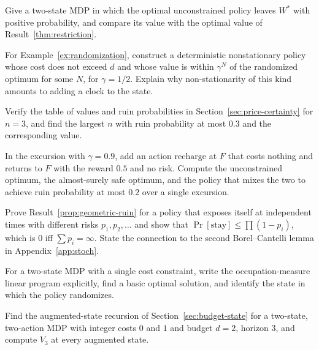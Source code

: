 \begin{exercise}
Give a two-state MDP in which the optimal unconstrained policy leaves $W^{*}$ with positive probability, and compare its value with the optimal value of Result~\ref{thm:restriction}.
\end{exercise}

\begin{exercise}
For Example~\ref{ex:randomization}, construct a deterministic nonstationary policy whose cost does not exceed $d$ and whose value is within $\gamma^{N}$ of the randomized optimum for some $N$, for $\gamma=1/2$. Explain why non-stationarity of this kind amounts to adding a clock to the state.
\end{exercise}

\begin{exercise}
Verify the table of values and ruin probabilities in Section~\ref{sec:price-certainty} for $n=3$, and find the largest $n$ with ruin probability at most $0.3$ and the corresponding value.
\end{exercise}

\begin{exercise}
In the excursion with $\gamma=0.9$, add an action $\mathrm{recharge}$ at $F$ that costs nothing and returns to $F$ with the reward $0.5$ and no risk. Compute the unconstrained optimum, the almost-surely safe optimum, and the policy that mixes the two to achieve ruin probability at most $0.2$ over a single excursion.
\end{exercise}

\begin{exercise}
Prove Result~\ref{prop:geometric-ruin} for a policy that exposes itself at independent times with different risks $p_1,p_2,\dots$ and show that $\Pr[\text{stay}]\le\prod(1-p_i)$, which is $0$ iff $\sum p_i=\infty$. State the connection to the second Borel--Cantelli lemma in Appendix~\ref{app:stoch}.\label{ex2:bc-ruin}
\end{exercise}

\begin{exercise}
For a two-state MDP with a single cost constraint, write the occupation-measure linear program explicitly, find a basic optimal solution, and identify the state in which the policy randomizes.
\end{exercise}

\begin{exercise}
Find the augmented-state recursion of Section~\ref{sec:budget-state} for a two-state, two-action MDP with integer costs $0$ and $1$ and budget $d=2$, horizon $3$, and compute $V_3$ at every augmented state.
\end{exercise}

